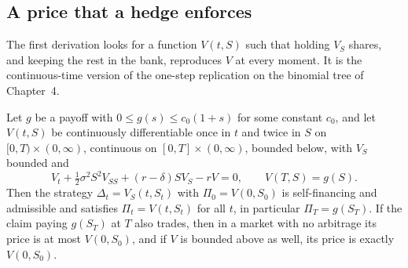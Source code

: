 \begin{chapterrefs}
\section{A price that a hedge enforces}
\label{sec5:hedge}

The first derivation looks for a function $V(t,S)$ such that holding $V_S$ shares, and keeping the rest
in the bank, reproduces $V$ at every moment. It is the continuous-time version of the one-step
replication on the binomial tree of Chapter~4.

\begin{theorem}\label{thm5:pde}
Let $g$ be a payoff with $0\le g(s)\le c_0(1+s)$ for some constant $c_0$, and let $V(t,S)$ be continuously
differentiable once in $t$ and twice in $S$ on $[0,T)\times(0,\infty)$, continuous on
$[0,T]\times(0,\infty)$, bounded below, with $V_S$ bounded and
\begin{equation}\label{eq5:pde}
  V_t+\tfrac12\sigma^2S^2V_{SS}+(r-\delta)SV_S-rV=0,\qquad V(T,S)=g(S).
\end{equation}
Then the strategy $\Delta_t=V_S(t,S_t)$ with $\Pi_0=V(0,S_0)$ is self-financing and admissible and
satisfies $\Pi_t=V(t,S_t)$ for all $t$, in particular $\Pi_T=g(S_T)$. If the claim paying $g(S_T)$
at $T$ also trades, then in a market with no arbitrage its price is at most $V(0,S_0)$, and if $V$ is
bounded above as well, its price is exactly $V(0,S_0)$.
\end{theorem}


\end{chapterrefs}
